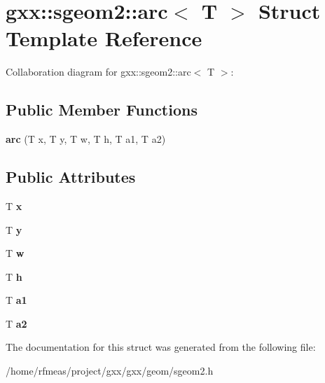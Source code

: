 \hypertarget{structgxx_1_1sgeom2_1_1arc}{}\section{gxx\+:\+:sgeom2\+:\+:arc$<$ T $>$ Struct Template Reference}
\label{structgxx_1_1sgeom2_1_1arc}


Collaboration diagram for gxx\+:\+:sgeom2\+:\+:arc$<$ T $>$\+:
\subsection*{Public Member Functions}
\begin{DoxyCompactItemize}
\item 
{\bfseries arc} (T x, T y, T w, T h, T a1, T a2)\hypertarget{structgxx_1_1sgeom2_1_1arc_afe3a2e6dc498bd2bd370d54d83c89e8c}{}\label{structgxx_1_1sgeom2_1_1arc_afe3a2e6dc498bd2bd370d54d83c89e8c}

\end{DoxyCompactItemize}
\subsection*{Public Attributes}
\begin{DoxyCompactItemize}
\item 
T {\bfseries x}\hypertarget{structgxx_1_1sgeom2_1_1arc_aceca8018c818f262614da61087acfaa5}{}\label{structgxx_1_1sgeom2_1_1arc_aceca8018c818f262614da61087acfaa5}

\item 
T {\bfseries y}\hypertarget{structgxx_1_1sgeom2_1_1arc_a21bb7ecae1eb51e584f949796b520bae}{}\label{structgxx_1_1sgeom2_1_1arc_a21bb7ecae1eb51e584f949796b520bae}

\item 
T {\bfseries w}\hypertarget{structgxx_1_1sgeom2_1_1arc_a6402054b1045e6bf4a8fe6c654a6d7ca}{}\label{structgxx_1_1sgeom2_1_1arc_a6402054b1045e6bf4a8fe6c654a6d7ca}

\item 
T {\bfseries h}\hypertarget{structgxx_1_1sgeom2_1_1arc_aba4128e7aeb022da0f5926c0a3054834}{}\label{structgxx_1_1sgeom2_1_1arc_aba4128e7aeb022da0f5926c0a3054834}

\item 
T {\bfseries a1}\hypertarget{structgxx_1_1sgeom2_1_1arc_a2808f13aba1886c257c990f43483082c}{}\label{structgxx_1_1sgeom2_1_1arc_a2808f13aba1886c257c990f43483082c}

\item 
T {\bfseries a2}\hypertarget{structgxx_1_1sgeom2_1_1arc_a6c965349a25cdc1585cc23efb41890d0}{}\label{structgxx_1_1sgeom2_1_1arc_a6c965349a25cdc1585cc23efb41890d0}

\end{DoxyCompactItemize}


The documentation for this struct was generated from the following file\+:\begin{DoxyCompactItemize}
\item 
/home/rfmeas/project/gxx/gxx/geom/sgeom2.\+h\end{DoxyCompactItemize}
